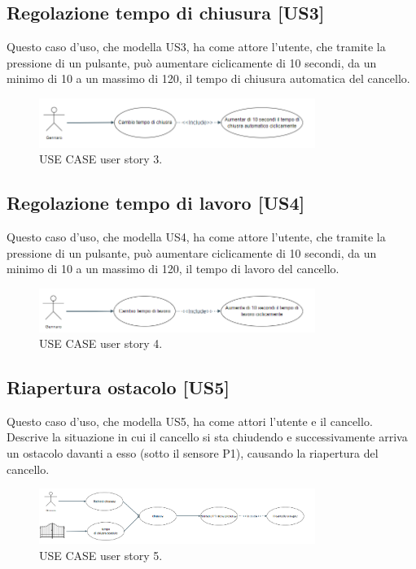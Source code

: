 \documentclass[12pt]{article}
\begin{document}
\subsection{Regolazione tempo di chiusura [US3]}
Questo caso d'uso, che modella US3, ha come attore l'utente, che tramite la pressione di un pulsante, può aumentare ciclicamente di 10 secondi, da un minimo di 10 a un massimo di 120, il tempo di chiusura automatica del cancello.
    \begin{figure}[H]
        \centering
        \includegraphics[width=0.8\textwidth]{use_case_us3.PNG}
        \caption{USE CASE user story 3.}
        \label{fig:use_case_us3}
    \end{figure}
\subsection{Regolazione tempo di lavoro [US4]}
Questo caso d'uso, che modella US4, ha come attore l'utente, che tramite la pressione di un pulsante, può aumentare ciclicamente di 10 secondi, da un minimo di 10 a un massimo di 120, il tempo di lavoro del cancello.
    \begin{figure}[H]
        \centering
        \includegraphics[width=0.8\textwidth]{use_case_us4.PNG}
        \caption{USE CASE user story 4.}
        \label{fig:use_case_us4}
    \end{figure}
\subsection{Riapertura ostacolo [US5]}
Questo caso d'uso, che modella US5, ha come attori l'utente e il cancello. Descrive la situazione in cui il cancello si sta chiudendo e successivamente arriva un ostacolo davanti a esso (sotto il sensore P1), causando la riapertura del cancello.
    \begin{figure}[H]
        \centering
        \includegraphics[width=0.8\textwidth]{use_case_us5.PNG}
        \caption{USE CASE user story 5.}
        \label{fig:use_case_us5}
    \end{figure}
\newpage
\end{document}

